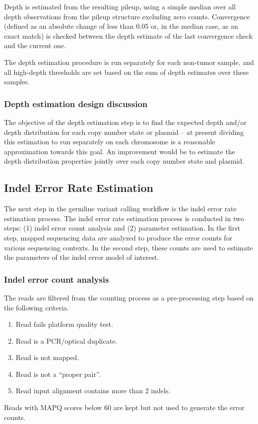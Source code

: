 \documentclass{article}
\begin{document}
Depth is estimated from the resulting pileup, using a simple median over all depth observations from the pileup structure excluding zero counts. Convergence (defined as an absolute change of less than 0.05 or, in the median case, as an exact match) is checked between the depth estimate of the last convergence check and the current one.

The depth estimation procedure is run separately for each non-tumor sample, and all high-depth thresholds are set based on the sum of depth estimates over these samples.


\subsubsection{Depth estimation design discussion}

The objective of the depth estimation step is to find the expected depth and/or depth distribution for each copy number state or plasmid -- at present dividing this estimation to run separately on each chromosome is a reasonable approximation towards this goal. An improvement would be to estimate the depth distribution properties jointly over each copy number state and plasmid.


\subsection{Indel Error Rate Estimation}
\label{sec:indel_error_est}
The next step in the germline variant calling workflow is the indel error rate estimation process. The indel error rate estimation process is conducted in two steps: (1) indel error count analysis and (2) parameter estimation. In the first step, mapped sequencing data are analyzed to produce the error counts for various sequencing contexts. In the second step, these counts are used to estimate the parameters of the indel error model of interest.

\subsubsection{Indel error count analysis}
The reads are filtered from the counting process as a pre-processing step based on the following criteria.
    \begin{enumerate}
        \item Read fails platform quality test.
        \item Read is a PCR/optical duplicate.
        \item Read is not mapped.
        \item Read is not a ``proper pair''.
        \item Read input alignment contains more than 2 indels.
    \end{enumerate}
Reads with MAPQ scores below 60 are kept but not used to generate the error counts.
\end{document}
